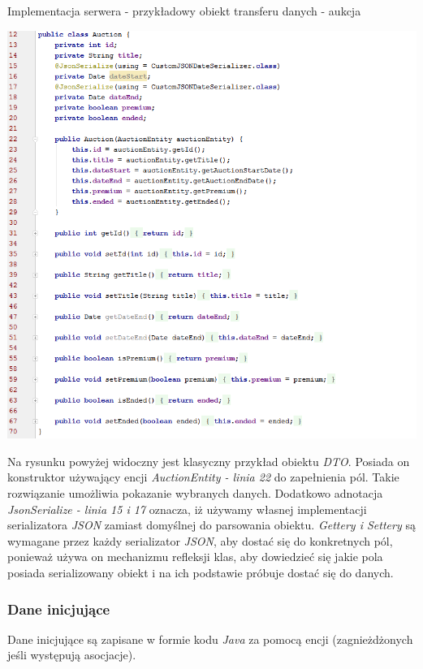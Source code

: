 \documentclass[10pt,titlepage]{article} %
\begin{document}
\begin{listing}[H]
\caption[Implementacja serwera - przykładowy obiekt transferu danych - aukcja]{Implementacja serwera - przykładowy obiekt transferu danych - aukcja}
\includegraphics[width=\textwidth]{img/sekcja3/backend/dtoAuction}
\end{listing}
Na rysunku powyżej widoczny jest klasyczny przykład obiektu \textit{DTO}. Posiada on konstruktor używający encji \textit{AuctionEntity - linia 22} do zapełnienia pól. Takie rozwiązanie umożliwia pokazanie wybranych danych. Dodatkowo adnotacja \textit{JsonSerialize - linia 15 i 17} oznacza, iż używamy własnej implementacji serializatora \textit{JSON} zamiast domyślnej do parsowania obiektu. \textit{Gettery i Settery} są wymagane przez każdy serializator \textit{JSON}, aby dostać się do konkretnych pól, ponieważ używa on mechanizmu refleksji klas, aby dowiedzieć się jakie pola posiada serializowany obiekt i na ich podstawie próbuje dostać się do danych.


\subsubsection{Dane inicjujące}
Dane inicjujące są zapisane w formie kodu \textit{Java} za pomocą encji (zagnieżdżonych jeśli występują asocjacje).
\end{document}
